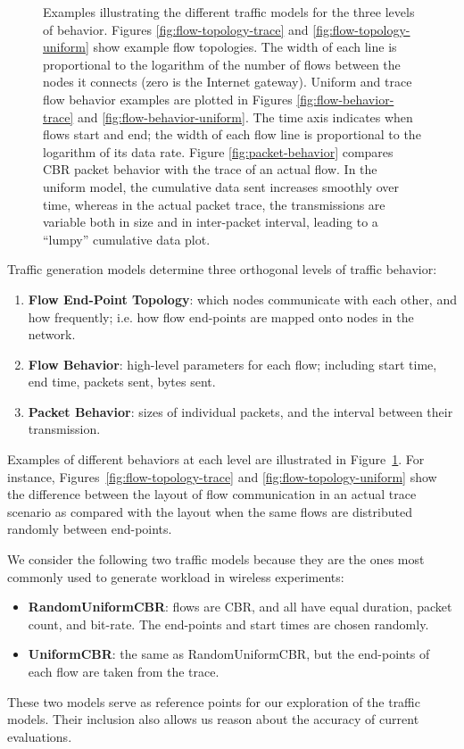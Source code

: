 \documentclass[conference]{IEEEtran}
\newcommand{\caps}[1]{{\small{#1}}}
\begin{document}
\begin{figure}[tb]
\begin{center}
\caption{Examples illustrating the different traffic models for the three levels of behavior. Figures \ref{fig:flow-topology-trace} and \ref{fig:flow-topology-uniform} show example flow topologies. The width of each line is proportional to the logarithm of the number of flows between the nodes it connects (zero is the Internet gateway). Uniform and trace flow behavior examples are plotted in Figures \ref{fig:flow-behavior-trace} and \ref{fig:flow-behavior-uniform}. The time axis indicates when flows start and end; the width of each flow line is proportional to the logarithm of its data rate. Figure \ref{fig:packet-behavior} compares \caps{CBR} packet behavior with the trace of an actual flow. In the uniform model, the cumulative data sent increases smoothly over time, whereas in the actual packet trace, the transmissions are variable both in size and in inter-packet interval, leading to a ``lumpy'' cumulative data plot.}
\label{fig:traffic-models}
\end{center}
\vspace{-2em}
\end{figure}

Traffic generation models determine three orthogonal levels of traffic behavior:
\begin{enumerate}
\item \textbf{Flow End-Point Topology}: which nodes communicate with each other, and how frequently; i.e. how flow end-points are mapped onto nodes in the network.
\item \textbf{Flow Behavior}: high-level parameters for each flow; including start time, end time, packets sent, bytes sent.
\item \textbf{Packet Behavior}: sizes of individual packets, and the interval between their transmission.
\end{enumerate}
Examples of different behaviors at each level are illustrated in Figure~\ref{fig:traffic-models}. For instance, Figures~\ref{fig:flow-topology-trace} and \ref{fig:flow-topology-uniform} show the difference between the layout of flow communication in an actual trace scenario as compared with the layout when the same flows are distributed randomly between end-points.

We consider the following two traffic models because they are the ones most commonly used to generate workload in wireless experiments:
\begin{itemize}
\item \textbf{RandomUniform\caps{CBR}}: flows are \caps{CBR}, and all have equal duration, packet count, and bit-rate. The end-points and start times are chosen randomly.
\item \textbf{Uniform\caps{CBR}}: the same as RandomUniform\caps{CBR}, but the end-points of each flow are taken from the trace.
\end{itemize}
These two models serve as reference points for our exploration of the traffic models. Their inclusion also allows us reason about the accuracy of current evaluations.
\end{document}
